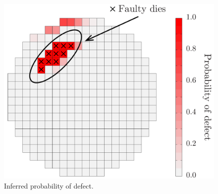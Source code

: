 \begin{figure}[b]
  \centering
  \includegraphics[width=0.6\linewidth]{include/figures/wafer-defective.pdf}
  \caption{Inferred probability of defect.}
\end{figure}
